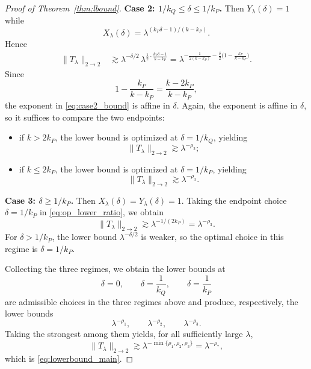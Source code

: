 \documentclass[10pt,a4paper]{amsart}
\begin{document}
\begin{proof}[Proof of Theorem~\ref{thm:lbound}]
		\smallskip
		\noindent\textbf{Case 2: $1/k_Q\le \delta\le 1/k_P$.}
		Then $Y_\lambda(\delta)=1$ while
		\[
		X_\lambda(\delta)=\lambda^{(k_P\delta-1)/(k-k_P)}.
		\]
		Hence
		\begin{align}
			\|T_\lambda\|_{2\to2}
			&\gtrsim \lambda^{-\delta/2}\,\lambda^{\frac12\cdot\frac{k_P\delta-1}{k-k_P}}
			=\lambda^{-\frac1{2(k-k_P)}-\frac{\delta}{2}\bigl(1-\frac{k_P}{k-k_P}\bigr)}.\label{eq:case2_bound}
		\end{align}
		Since
		\[
		1-\frac{k_P}{k-k_P}=\frac{k-2k_P}{k-k_P},
		\]
		the exponent in \eqref{eq:case2_bound} is affine in $\delta$. Again,
        the exponent is affine in $\delta$,
        so it suffices to compare the two endpoints:
		\begin{itemize}
			\item if $k>2k_P$, the lower bound is optimized at $\delta=1/k_Q$, yielding
			\[
			\|T_\lambda\|_{2\to2}\gtrsim \lambda^{-\rho_2};
			\]
			\item if $k\le 2k_P$, the lower bound is optimized at $\delta=1/k_P$, yielding
			\[
			\|T_\lambda\|_{2\to2}\gtrsim \lambda^{-\rho_3}.
			\]
		\end{itemize}
		
		\smallskip
		\noindent\textbf{Case 3: $\delta\ge 1/k_P$.}
		Then $X_\lambda(\delta)=Y_\lambda(\delta)=1$.
			Taking the endpoint choice $\delta=1/k_P$ in \eqref{eq:op_lower_ratio}, we obtain
			\[
			\|T_\lambda\|_{2\to2}
			\gtrsim
			\lambda^{-1/(2k_P)}
			=
			\lambda^{-\rho_3}.
			\]
			For $\delta>1/k_P$, the lower bound $\lambda^{-\delta/2}$ is weaker, so the optimal choice in this regime is
			$\delta=1/k_P$.
		
		
	
			Collecting the three regimes,
we obtain the lower bounds at
			\[
			\delta=0,\qquad \delta=\frac1{k_Q},\qquad \delta=\frac1{k_P}
			\]
			are admissible choices in the three regimes above and produce, respectively, the lower bounds
			\[
			\lambda^{-\rho_1},\qquad
			\lambda^{-\rho_2},\qquad
			\lambda^{-\rho_3}.
			\]
			Taking the strongest among them yields, for all sufficiently large $\lambda$,
		\[
		\|T_\lambda\|_{2\to2}
		\gtrsim \lambda^{-\min\{\rho_1,\rho_2,\rho_3\}}
		=\lambda^{-\rho_*},
		\]
		which is \eqref{eq:lowerbound_main}.
	\end{proof}
\end{document}

